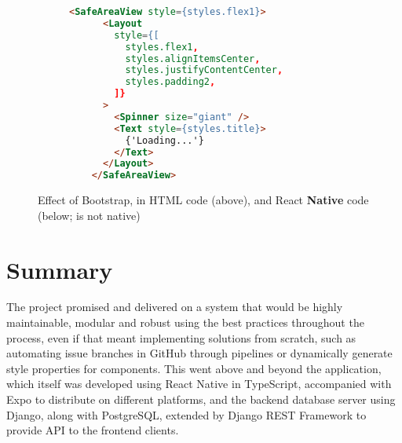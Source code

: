 \documentclass[../main.tex]{subfiles}
\begin{document}
\begin{figure}
\begin{subfigure}{.49\textwidth}
    \begin{lstlisting}[language=html, caption={example of usage like Bootstrap in \citecode{SrcAppNavigation}}]
    <SafeAreaView style={styles.flex1}>
      <Layout
        style={[
          styles.flex1,
          styles.alignItemsCenter,
          styles.justifyContentCenter,
          styles.padding2,
        ]}
      >
        <Spinner size="giant" />
        <Text style={styles.title}>
          {'Loading...'}
        </Text>
      </Layout>
    </SafeAreaView>
    \end{lstlisting}
    \end{subfigure}
    \caption{Effect of Bootstrap, in HTML code (above), and React \textbf{Native} code (below;  is not native)}%
\end{figure}

\section*{Summary}

The project promised and delivered on a system that would be highly maintainable, modular and robust using the best practices throughout the process, even if that meant implementing solutions from scratch, such as automating issue branches in GitHub through pipelines or dynamically generate style properties for components. This went above and beyond the application, which itself was developed using React Native in TypeScript, accompanied with Expo to distribute on different platforms, and the backend database server using Django, along with PostgreSQL, extended by Django REST Framework to provide API to the frontend clients.
\end{document}
